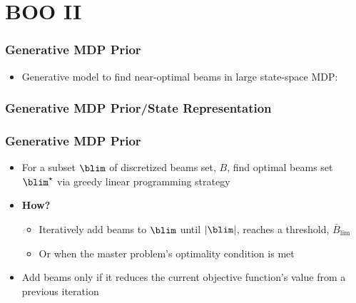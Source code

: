 \section{BOO II}

\begin{frame}
	\frametitle{Generative MDP Prior}
	\begin{itemize}
		\item Generative model to find near-optimal beams in large state-space MDP: ~\cite{Azar19MICCAI, AzarPMB19}
	\end{itemize}
	\frametitle{Generative MDP Prior/State Representation}
\centering
{}
\end{frame}


\begin{frame}
\frametitle{Generative MDP Prior}
\begin{itemize}
	\item For a subset  $\blim$ of discretized beams set, $B$, find  optimal beams set $\blim^\star$ via greedy linear programming strategy
	\vspace{0.1in}
	\item \textbf{How?}
	\begin{itemize}
		\item Iteratively add beams to $\blim$ until $|\blim|$, reaches a threshold, $\bar{B}_{\text{lim}}$
		\vspace{0.1in}
		\item Or when the master problem's optimality condition is met
	\end{itemize}
	\vspace{0.1in}
	\item Add beams only if it reduces the current objective function's value from a previous iteration
\end{itemize}
\end{frame}

